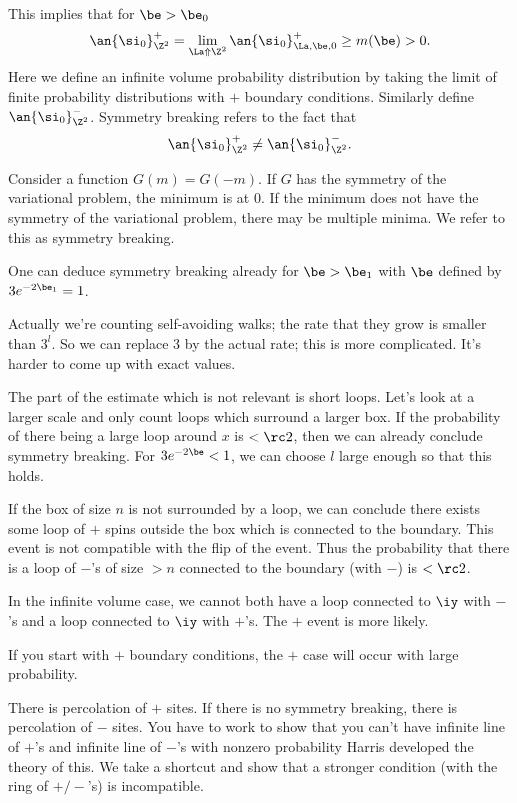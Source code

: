 This implies that for $\be>\be_0$
\[
\an{\si_0}_{\Z^2}^+=\lim_{\La \Uparrow \Z^2} \an{\si_0}_{\La,\be,0}^+ \ge m(\be)>0.
\]
Here we define an infinite volume probability distribution by taking the limit of finite probability distributions with $+$ boundary conditions.   Similarly define $\an{\si_0}_{\Z^2}^-$. Symmetry breaking refers to the fact that
\[
\an{\si_0}_{\Z^2}^+\ne \an{\si_0}_{\Z^2}^-.
\]

Consider a function $G(m)=G(-m)$. If $G$ has the symmetry of the variational problem, the minimum is at 0.
If the minimum does not have the symmetry of the variational problem, there may be multiple minima. We refer to this as symmetry breaking.

\begin{rem}
One can deduce symmetry breaking already for $\be>\be_1$ with $\be$ defined by $3e^{-2\be_1}=1$. 

Actually we're counting self-avoiding walks; the rate that they grow is smaller than $3^l$. So we can replace 3 by the actual rate; this is more complicated. It's harder to come up with exact values.
\end{rem}

The part of the estimate which is not relevant is short loops. Let's look at a larger scale and only count loops which surround a larger box. If the probability of there being a large loop around $x$ is $<\rc2$, then we can already conclude symmetry breaking. For $3e^{-2\be}<1$, we can choose $l$ large enough so that this holds.

If the box of size $n$ is not surrounded by a loop, we can conclude there exists some loop of $+$ spins outside the box which is connected to the boundary. %
This event is not compatible with the flip of the event. Thus the probability that there is a loop of $-$'s of size $>n$ connected to the boundary (with $-$) is $<\rc2$.

In the infinite volume case, we cannot both have a loop connected to $\iy$ with $-$'s and a loop connected to $\iy$ with $+$'s. The $+$ event is more likely.

If you start with $+$ boundary conditions, the $+$ case will occur with large probability.

There is percolation of $+$ sites. If there is no symmetry breaking, there is percolation of $-$ sites. You have to work to show that you can't have infinite line of $+$'s and infinite line of $-$'s with nonzero probability  %
Harris developed the theory of this. We take a shortcut and show that a stronger condition (with the ring of $+/-$'s) is incompatible.

